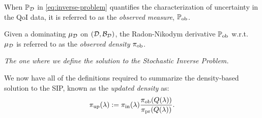 \begin{frame}

\begin{defn}\label{defn:observed}
When $\mathbb{P}_{\mathcal{D}}$ in \eqref{eq:inverse-problem} quantifies the characterization of uncertainty in the QoI data, it is referred to as the \emph{observed measure}, $\operatorname*{\mathbb{P}_{ob}}$.
\bigskip

Given a dominating $\mu_{\mathcal{D}}$ on $(\mathcal{D}, \mathcal{B}_{\mathcal{D}})$, the Radon-Nikodym derivative $\operatorname*{\mathbb{P}_{ob}}$ w.r.t. $\mu_{\mathcal{D}}$ is referred to as the  \emph{observed density} $\operatorname*{\pi_{ob}}$.
\end{defn}

\end{frame}


\begin{frame}{\it The one where we define the solution to the Stochastic Inverse Problem.}

We now have all of the definitions required to summarize the density-based solution to the SIP, known as the \emph{updated density} as:
\vskip 10pt
\begin{equation}\label{eq:updated-pdf}
	\operatorname*{\pi_{up}}(\lambda) := \operatorname*{\pi_{in}}(\lambda)\frac{\operatorname*{\pi_{ob}}(Q(\lambda))}{\operatorname*{\pi_{pr}}(Q(\lambda))}.
\end{equation}

\end{frame}

